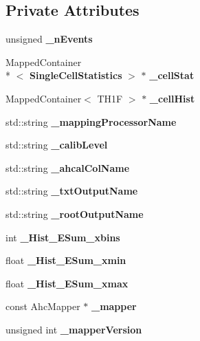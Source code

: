 \subsection*{Private Attributes}
\begin{DoxyCompactItemize}
\item 
unsigned {\bfseries \-\_\-n\-Events}\label{classCALICE_1_1SingleCellAnalysis_a99f44821b039d92c25bf7b13bf4778bc}

\item 
Mapped\-Container\\*
$<$ {\bf Single\-Cell\-Statistics} $>$ $\ast$ {\bfseries \-\_\-cell\-Stat}\label{classCALICE_1_1SingleCellAnalysis_a42a5e7563ad65e0eebf4a0108da517c8}

\item 
Mapped\-Container$<$ T\-H1\-F $>$ $\ast$ {\bfseries \-\_\-cell\-Hist}\label{classCALICE_1_1SingleCellAnalysis_ae4c707658817e2de1b67ac8c348ebf7f}

\item 
std\-::string {\bfseries \-\_\-mapping\-Processor\-Name}\label{classCALICE_1_1SingleCellAnalysis_afc6fc973e6a22a2ca0003076f7c3345b}

\item 
std\-::string {\bfseries \-\_\-calib\-Level}\label{classCALICE_1_1SingleCellAnalysis_a8b30b37473b52f887be5a30806fcd471}

\item 
std\-::string {\bfseries \-\_\-ahcal\-Col\-Name}\label{classCALICE_1_1SingleCellAnalysis_af2763329df8455f7475bdd0d46fdf22f}

\item 
std\-::string {\bfseries \-\_\-txt\-Output\-Name}\label{classCALICE_1_1SingleCellAnalysis_a23feaeb7047a6b87370dd9870385c24c}

\item 
std\-::string {\bfseries \-\_\-root\-Output\-Name}\label{classCALICE_1_1SingleCellAnalysis_a399a21983ff24615e85f186dd59020a1}

\item 
int {\bfseries \-\_\-\-Hist\-\_\-\-E\-Sum\-\_\-xbins}\label{classCALICE_1_1SingleCellAnalysis_ab136d1bac5cce09b328aadcab013468d}

\item 
float {\bfseries \-\_\-\-Hist\-\_\-\-E\-Sum\-\_\-xmin}\label{classCALICE_1_1SingleCellAnalysis_a0d9fe5ae453a208f089f36b7b1ebdc22}

\item 
float {\bfseries \-\_\-\-Hist\-\_\-\-E\-Sum\-\_\-xmax}\label{classCALICE_1_1SingleCellAnalysis_a51a9aa087d66f118aa914f062c9b9fee}

\item 
const Ahc\-Mapper $\ast$ {\bfseries \-\_\-mapper}\label{classCALICE_1_1SingleCellAnalysis_a385a9c5bbbb3d62c2d0741934d064a03}

\item 
unsigned int {\bfseries \-\_\-mapper\-Version}\label{classCALICE_1_1SingleCellAnalysis_a5c6a21d4d86ac54e6039504f97ba741e}

\end{DoxyCompactItemize}


